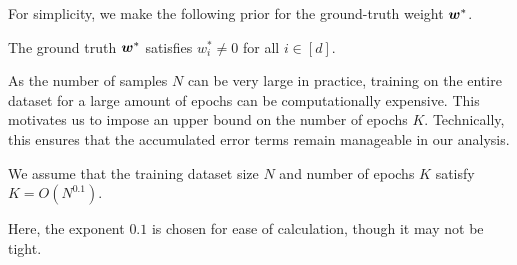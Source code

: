 \vspace{-0.05in}
For simplicity, we make the following prior for the ground-truth weight ${\bm{w}}^*$.
\begin{assumption} \label{asp:strongly-convex-parameter-prior}
    The ground truth ${\bm{w}}^*$ satisfies $w^*_i \ne 0$ for all $i\in[d]$.
\end{assumption}

\vspace{-0.05in}
As the number of samples $N$ can be very large in practice, training on the entire dataset for a large amount of epochs can be computationally expensive.
This motivates us to impose an upper bound on the number of epochs $K$. Technically, this ensures that the accumulated error terms remain manageable in our analysis.
\begin{assumption}\label{asp:large-dataset}
We assume that the training dataset size $N$ and number of epochs $K$ satisfy $K = O(N^{0.1})$.
\end{assumption}

\vspace{-0.05in}
Here, the exponent $0.1$ is chosen for ease of calculation, though it may not be tight.




